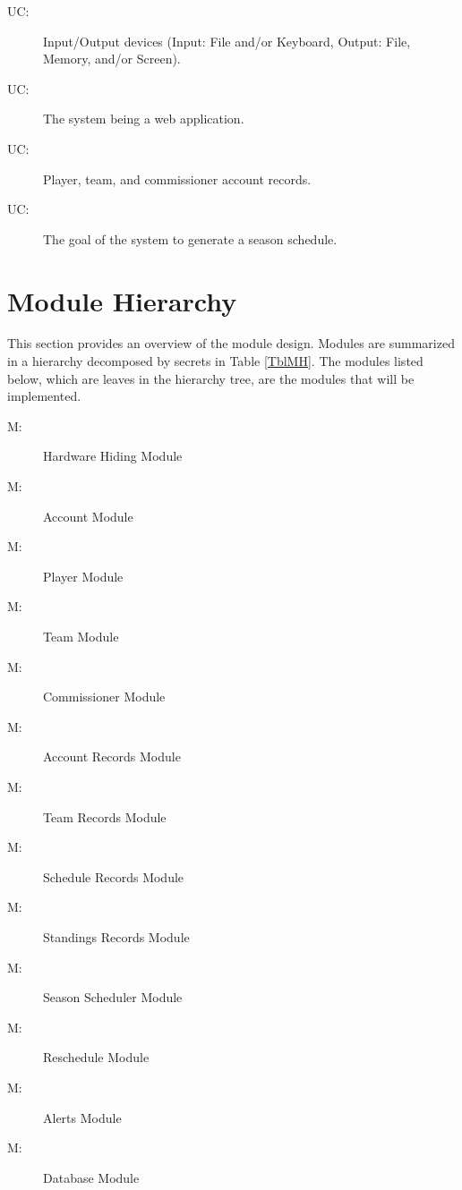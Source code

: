 \documentclass[12pt, titlepage]{article}
\newcounter{ucnum}
\newcommand{\uctheucnum}{UC\theucnum}
\newcounter{mnum}
\newcommand{\mthemnum}{M\themnum}
\begin{document}
\begin{description}
  \item[ \uctheucnum \label{ucIO}:] Input/Output devices
  (Input: File and/or Keyboard, Output: File, Memory, and/or Screen).
  \item[ \uctheucnum \label{ucWeb}:] The system being a
  web application.
  \item[ \uctheucnum \label{ucAccStr}:] Player, team,
  and commissioner account records.
  \item[ \uctheucnum \label{ucSched}:] The goal of the
  system to generate a season schedule.
\end{description}

\section{Module Hierarchy} \label{SecMH}

This section provides an overview of the module design. Modules are summarized
in a hierarchy decomposed by secrets in Table \ref{TblMH}. The modules listed
below, which are leaves in the hierarchy tree, are the modules that will
be implemented.

\begin{description}
  \item [ \mthemnum \label{mHH}:] Hardware Hiding Module
  \item [ \mthemnum \label{mAC}:] Account Module
  \item [ \mthemnum \label{mPL}:] Player Module
  \item [ \mthemnum \label{mTE}:] Team Module
  \item [ \mthemnum \label{mCM}:] Commissioner Module
  \item [ \mthemnum \label{mAS}:] Account Records
  Module
  \item [ \mthemnum \label{mTS}:] Team Records Module
  \item [ \mthemnum \label{mSS}:] Schedule Records
  Module
  \item [ \mthemnum \label{mST}:] Standings Records
  Module
  \item [ \mthemnum \label{mS}:] Season Scheduler Module
  \item [ \mthemnum \label{mRE}:] Reschedule Module
  \item [ \mthemnum \label{mAL}:] Alerts Module
  \item [ \mthemnum \label{mDB}:] Database Module
\end{description}
\end{document}

